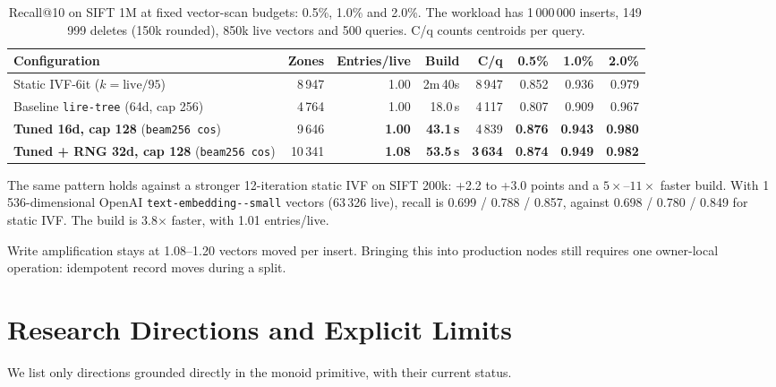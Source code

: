 \documentclass[11pt]{article}
\begin{document}
\begin{table}[H]
\centering
\footnotesize
\setlength{\tabcolsep}{3.5pt}
\renewcommand{\arraystretch}{1.18}
\begin{tabularx}{\linewidth}{@{}Lrrrrrrr@{}}
\toprule
Configuration & Zones & Entries/live & Build & C/q & 0.5\% & 1.0\% & 2.0\% \\
\midrule
Static IVF-6it ($k = \text{live}/95$) & 8\,947 & 1.00 & 2m\,40s & 8\,947 & 0.852 & 0.936 & 0.979 \\
Baseline \texttt{lire-tree} (64d, cap 256) & 4\,764 & 1.00 & 18.0\,s & 4\,117 & 0.807 & 0.909 & 0.967 \\
\textbf{Tuned 16d, cap 128} (\texttt{beam256 cos}) & 9\,646 & \textbf{1.00} & \textbf{43.1\,s} & 4\,839 & \textbf{0.876} & \textbf{0.943} & \textbf{0.980} \\
\textbf{Tuned + RNG 32d, cap 128} (\texttt{beam256 cos}) & 10\,341 & \textbf{1.08} & \textbf{53.5\,s} & \textbf{3\,634} & \textbf{0.874} & \textbf{0.949} & \textbf{0.982} \\
\bottomrule
\end{tabularx}
\caption{Recall@10 on SIFT 1M at fixed vector-scan budgets: 0.5\%, 1.0\% and 2.0\%. The workload has 1\,000\,000 inserts, 149\,999 deletes (150k rounded), 850k live vectors and 500 queries. C/q counts centroids per query.}
\end{table}

The same pattern holds against a stronger 12-iteration static IVF on SIFT 200k: +2.2 to +3.0 points and a $5\times$--$11\times$ faster build. With 1\,536-dimensional OpenAI \texttt{text-\allowbreak embedding--\allowbreak small} vectors (63\,326 live), recall is 0.699 / 0.788 / 0.857, against 0.698 / 0.780 / 0.849 for static IVF. The build is 3.8$\times$ faster, with 1.01 entries/live.

Write amplification stays at 1.08--1.20 vectors moved per insert. Bringing this into production nodes still requires one owner-local operation: idempotent record moves during a split.

\section{Research Directions and Explicit Limits}\hypertarget{ix:limits}{}\label{sec:directions}
We list only directions grounded directly in the monoid primitive, with their current status.
\end{document}
